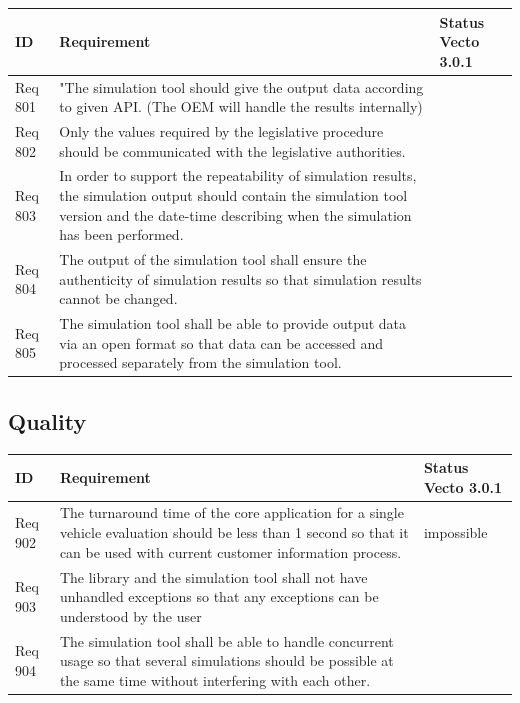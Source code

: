 \begin{tabular}{L{\IdColWidth}|L{\ReqColWidth}|M{\StatusColWidth}}
ID & Requirement & Status Vecto 3.0.1 \\ \hline\hline
Req 801 & "The simulation tool should give the output data according to given API. (The OEM will handle the results internally) & 
		 \\ \hline
Req 802 & Only the values required by the legislative procedure should be communicated with the legislative authorities. & 
		 \\ \hline
Req 803 & In order to support the repeatability of simulation results, the simulation output should contain the simulation tool version and the date-time describing when the simulation has been performed.  & 
		 \\ \hline
Req 804 & The output of the simulation tool shall ensure the authenticity of simulation results so that simulation results cannot be changed.  & 
		 \\ \hline
Req 805 & The simulation tool shall be able to provide output data via an open format so that data can be accessed and processed separately from the simulation tool. & 
		 \\ \hline
\end{tabular}

\subsection{Quality} %
\label{sub:quality}

\begin{tabular}{L{\IdColWidth}|L{\ReqColWidth}|M{\StatusColWidth}}
ID & Requirement & Status Vecto 3.0.1 \\ \hline\hline
Req 902 & The turnaround time of the core application for a single vehicle evaluation should be less than 1 second so that it can be used with current customer information process. & 
	impossible	 \\ \hline
Req 903 & The library and the simulation tool shall not have unhandled exceptions so that any exceptions can be understood by the user & 
	\Vcheck	 \\ \hline
Req 904 & The simulation tool shall be able to handle concurrent usage so that several simulations should be possible at the same time without interfering with each other. & 
	\Vcheck	 \\ \hline
\end{tabular}




